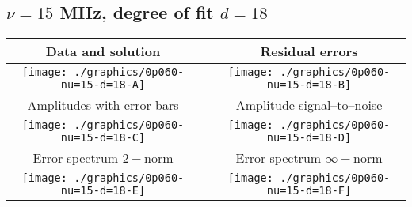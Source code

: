 

% 

\clearpage{}
\break{}

\subsection{$\nu = 15$ MHz, degree of fit $d = 18$}

\begin{table}[h]
    \begin{center}
        \begin{tabular}{ccc}
            Data and solution & \quad & Residual errors \\\hline
            \texttt{[image: ./graphics/0p060-nu=15-d=18-A]} &&
            \texttt{[image: ./graphics/0p060-nu=15-d=18-B]} \\[15pt]
            Amplitudes with error bars && Amplitude signal--to--noise \\\hline
            \texttt{[image: ./graphics/0p060-nu=15-d=18-C]} &&
            \texttt{[image: ./graphics/0p060-nu=15-d=18-D]} \\[15pt]
            Error spectrum $2-$norm && Error spectrum $\infty-$norm \\\hline
            \texttt{[image: ./graphics/0p060-nu=15-d=18-E]} &&
            \texttt{[image: ./graphics/0p060-nu=15-d=18-F]} \\[15pt]
        \end{tabular}
    \end{center}
\label{fig:elev=60, nu=15}
\end{table}



\endinput
